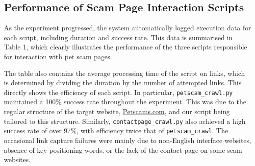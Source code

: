 \documentclass[ oneside,%
                    author={Cassie Qing Tang},
                    degree={BSc},
                     title={An Automated Response System for Disrupting Online Pet Scamming \\ },
                    subtitle={ }]{dissertation}
\begin{document}
\subsection{Performance of Scam Page Interaction Scripts}
As the experiment progressed, the system automatically logged execution data for each script, including duration and success rate. This data is summarised in Table 1, which clearly illustrates the performance of the three scripts responsible for interaction with pet scam pages.
{\small
\begin{table}[ht]
\centering
\label{tab:performance}
\caption{Table 1: Summary of script performance metrics}
\end{table}
} 

The table also contains the average processing time of the script on links, which is determined by dividing the duration by the number of attempted links. This directly shows the efficiency of each script. In particular, \texttt{petscam\_crawl.py} maintained a 100\% success rate throughout the experiment. This was due to the regular structure of the target website, \href{www.petscams.com}{Petscams.com}, and our script being tailored to this structure. Similarly, \texttt{contactpage\_crawl.py} also achieved a high success rate of over 97\%, with efficiency twice that of \texttt{petscam\_crawl}. The occasional link capture failures were mainly due to non-English interface websites, absence of key positioning words, or the lack of the contact page on some scam websites.
\\
\end{document}
